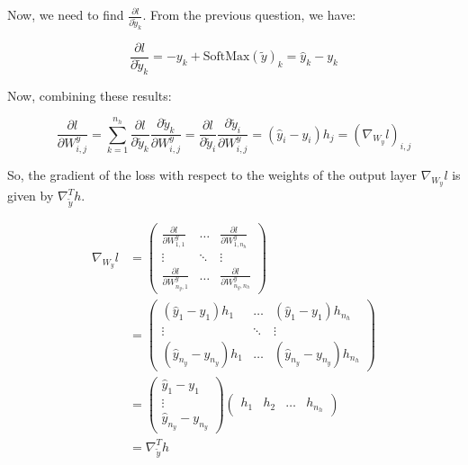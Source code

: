 Now, we need to find \( \frac{\partial l}{\partial \tilde{y}_k} \). From the previous question, we have:

\[
    \frac{\partial l}{\partial \tilde{y}_k} = -y_k + \text{SoftMax}(\tilde{y})_k = \hat{y}_k - y_k
\]

Now, combining these results:

\[
    \frac{\partial l}{\partial W_{i,j}^y} = \sum_{k=1}^{n_h} \frac{\partial l}{\partial \tilde{y}_k} \frac{\partial \tilde{y}_k}{\partial W_{i,j}^y} =  \frac{\partial l}{\partial \tilde{y}_i} \frac{\partial \tilde{y}_i}{\partial W_{i,j}^y} = (\hat{y}_i - y_i) h_j = (\nabla _{W_y} l)_{i,j}
\]

So, the gradient of the loss with respect to the weights of the output layer \( \nabla_{W_y} l \) is given by \( \nabla _{\tilde{y}} ^T h \).

\begin{align*}
    \nabla_{W_y} l & = \begin{pmatrix}
        \frac{\partial l}{\partial W^y_{1,1}}   & \dots  & \frac{\partial l}{\partial W^y_{1,n_h}}    \\
        \vdots                                  & \ddots & \vdots                                     \\
        \frac{\partial l}{\partial W^y_{n_y,1}} & \dots  & \frac{\partial l}{\partial W^y_{n_y, n_h}}
    \end{pmatrix}                            \\
                   & = \begin{pmatrix}
        (\hat{y}_1 - y_1) h_{1}         & \dots  & (\hat{y}_1 - y_1) h_{n_h}         \\
        \vdots                          & \ddots & \vdots                            \\
        (\hat{y}_{n_y} - y_{n_y}) h_{1} & \dots  & (\hat{y}_{n_y} - y_{n_y}) h_{n_h}
    \end{pmatrix}                            \\
                   & = \begin{pmatrix}
        \hat{y}_1 - y_1 \\
        \vdots          \\
        \hat{y}_{n_y} - y_{n_y}
    \end{pmatrix} \begin{pmatrix}
        h_1 & h_2 & \dots & h_{n_h}
    \end{pmatrix} \\
                   & = \nabla _{\tilde{y}} ^T h
\end{align*}


